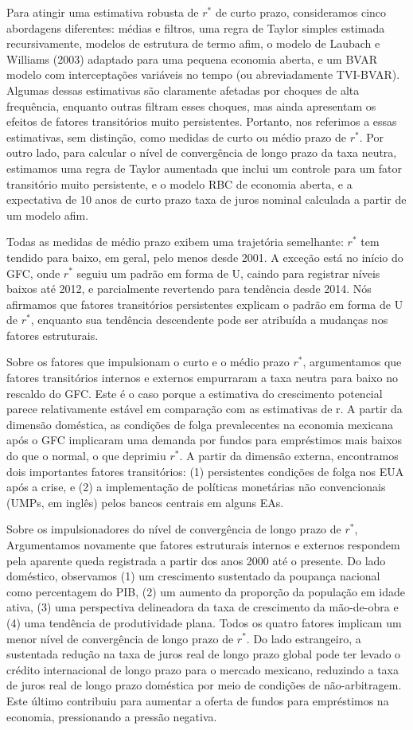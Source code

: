 \documentclass[11pt,oneside,a4paper]{article}
\begin{document}
Para atingir uma estimativa robusta de $r^{*}$ de curto prazo, consideramos cinco abordagens diferentes: médias e filtros, uma regra de Taylor simples estimada recursivamente, modelos de estrutura de termo afim, o modelo de Laubach e Williams (2003) adaptado para uma pequena economia aberta, e um BVAR modelo com interceptações variáveis no tempo (ou abreviadamente TVI-BVAR). Algumas dessas estimativas são claramente afetadas por choques de alta frequência, enquanto outras filtram esses choques, mas ainda apresentam os efeitos de fatores transitórios muito persistentes. Portanto, nos referimos a essas estimativas, sem distinção, como medidas de curto ou médio prazo de $r^{*}$. Por outro lado, para calcular o nível de convergência de longo prazo da taxa neutra, estimamos uma regra de Taylor aumentada que inclui um controle para um fator transitório muito persistente, e o modelo RBC de economia aberta, e a expectativa de 10 anos de curto prazo taxa de juros nominal calculada a partir de um modelo afim.

Todas as medidas de médio prazo exibem uma trajetória semelhante: $r^{*}$ tem tendido para baixo, em geral, pelo menos desde 2001. A exceção está no início do GFC, onde $r^{*}$ seguiu um padrão em forma de U, caindo para registrar níveis baixos até 2012, e parcialmente revertendo para tendência desde 2014. Nós afirmamos que fatores transitórios persistentes explicam o padrão em forma de U de $r^{*}$, enquanto sua tendência descendente pode ser atribuída a mudanças nos fatores estruturais.

Sobre os fatores que impulsionam o curto e o médio prazo $r^{*}$, argumentamos que fatores transitórios internos e externos empurraram a taxa neutra para baixo no rescaldo do GFC. Este é o caso porque a estimativa do crescimento potencial parece relativamente estável em comparação com as estimativas de r. A partir da dimensão doméstica, as condições de folga prevalecentes na economia mexicana após o GFC implicaram uma demanda por fundos para empréstimos mais baixos do que o normal, o que deprimiu $r^{*}$. A partir da dimensão externa, encontramos dois importantes fatores transitórios: (1) persistentes condições de folga nos EUA após a crise, e (2) a implementação de políticas monetárias não convencionais (UMPs, em inglês) pelos bancos centrais em alguns EAs.

Sobre os impulsionadores do nível de convergência de longo prazo de $r^{*}$, Argumentamos novamente que fatores estruturais internos e externos respondem pela aparente queda registrada a partir dos anos 2000 até o presente. Do lado doméstico, observamos (1) um crescimento sustentado da poupança nacional como percentagem do PIB, (2) um aumento da proporção da população em idade ativa, (3) uma perspectiva delineadora da taxa de crescimento da mão-de-obra e (4) uma tendência de produtividade plana. Todos os quatro fatores implicam um menor nível de convergência de longo prazo de $r^{*}$. Do lado estrangeiro, a sustentada redução na taxa de juros real de longo prazo global pode ter levado o crédito internacional de longo prazo para o mercado mexicano, reduzindo a taxa de juros real de longo prazo doméstica por meio de condições de não-arbitragem. Este último contribuiu para aumentar a oferta de fundos para empréstimos na economia, pressionando a pressão negativa.
%
%
\end{document}
